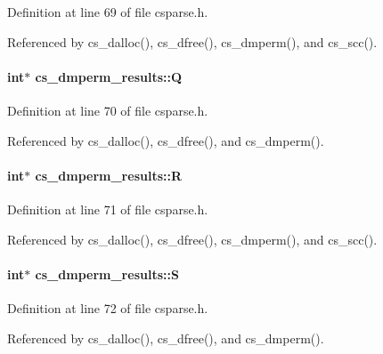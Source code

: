 Definition at line 69 of file csparse.\-h.



Referenced by cs\-\_\-dalloc(), cs\-\_\-dfree(), cs\-\_\-dmperm(), and cs\-\_\-scc().

\hypertarget{structcs__dmperm__results_a6d15026e4edf9c0e56fbfc7ec758bafb}{
\paragraph[{Q}]{\setlength{\rightskip}{0pt plus 5cm}int$\ast$ cs\-\_\-dmperm\-\_\-results\-::\-Q}}\label{structcs__dmperm__results_a6d15026e4edf9c0e56fbfc7ec758bafb}


Definition at line 70 of file csparse.\-h.



Referenced by cs\-\_\-dalloc(), cs\-\_\-dfree(), and cs\-\_\-dmperm().

\hypertarget{structcs__dmperm__results_a7962d0f1b98b88e96fdc86bfe2be4e39}{
\paragraph[{R}]{\setlength{\rightskip}{0pt plus 5cm}int$\ast$ cs\-\_\-dmperm\-\_\-results\-::\-R}}\label{structcs__dmperm__results_a7962d0f1b98b88e96fdc86bfe2be4e39}


Definition at line 71 of file csparse.\-h.



Referenced by cs\-\_\-dalloc(), cs\-\_\-dfree(), cs\-\_\-dmperm(), and cs\-\_\-scc().

\hypertarget{structcs__dmperm__results_a841c1955bb06ae973c60fc68b35c9610}{
\paragraph[{S}]{\setlength{\rightskip}{0pt plus 5cm}int$\ast$ cs\-\_\-dmperm\-\_\-results\-::\-S}}\label{structcs__dmperm__results_a841c1955bb06ae973c60fc68b35c9610}


Definition at line 72 of file csparse.\-h.



Referenced by cs\-\_\-dalloc(), cs\-\_\-dfree(), and cs\-\_\-dmperm().

